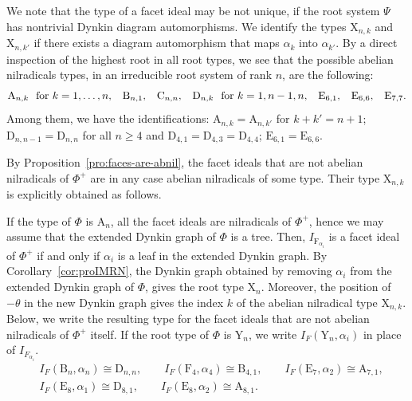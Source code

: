 \documentclass[ALCO,published]{cedram}
\theoremstyle{plain}
\newcommand\xuad{\hspace{2ex}}
\newcommand\al{\alpha}
\begin{document}
\par
We note that the type of a facet ideal may be not unique, if the root system $\Psi$ has nontrivial Dynkin diagram automorphisms. 
We identify the types $\mathrm X_{n,k}$ and $\mathrm X_{n,k'}$ if there exists a diagram automorphism that maps $\al_k$ into $\al_{k'}$.   
By a direct inspection of the highest root in all root types, we see that the possible abelian nilradicals types,  in an irreducible root system of rank $n$, are the following:  
$$
\mathrm A_{n, k}\ \text{ for } k=1,\dots, n, \xuad \mathrm B_{n,1},\xuad \mathrm C_{n, n},\xuad \mathrm D_{n,k}\ \text{ for } k=1, n-1, n,\xuad \mathrm E_{6,1},\xuad  \mathrm E_{6,6},\xuad \mathrm E_{7, 7}.
$$
Among them, we have  the identifications: $\mathrm A_{n, k}=\mathrm A_{n, k'}$
for $k+k'=n+1$; $\mathrm D_{n,n-1}=\mathrm D_{n,n}$ for all $n\geq 4$ and  $\mathrm D_{4,1}=\mathrm D_{4,3}=\mathrm D_{4,4}$; $\mathrm E_{6,1}=\mathrm E_{6,6}$.

\par
By  Proposition~\ref{pro:faces-are-abnil},  the facet ideals that are not abelian nilradicals of $\Phi^+$ are in any case abelian nilradicals of some type. 
Their type  $\mathrm X_{n,k}$ is explicitly obtained as follows.

\par
If the type of $\Phi$ is $\mathrm A_n$, all the facet ideals are nilradicals of $\Phi^+$, hence we may assume that the extended Dynkin graph of $\Phi$ is a tree.
Then, $I_{\mathrm F_{\al_i}}$ is a facet ideal of $\Phi^+$ if and only if  $\al_i$ is a leaf in the extended Dynkin graph.
By Corollary~\ref{cor:proIMRN}, the Dynkin graph obtained by removing $\al_i$ from the extended Dynkin graph of $\Phi$, gives the root type $\mathrm X_n$. 
Moreover, the position of $-\theta$ in the new Dynkin graph gives the index $k$ of the abelian nilradical type $\mathrm X_{n,k}$. 
Below, we write the resulting type for the facet ideals that are not abelian nilradicals of $\Phi^+$ itself. 
If the root type of $\Phi$ is  $\mathrm Y_n$, we write $I_F(\mathrm Y_n, \al_i)$ in place of $I_{F_{\al_i}}$.
\begin{align*}
&I_F(\mathrm B_n,\al_n)\cong \mathrm D_{n,n},\qquad 
I_F(\mathrm F_4,\al_4)\cong \mathrm B_{4,1},\qquad 
I_F(\mathrm E_7,\al_2) \cong \mathrm A_{7,1},
\\ 
&I_F({\mathrm E_8},\al_1)\cong \mathrm D_{8,1},\qquad I_F(\mathrm E_8,\al_2) \cong \mathrm A_{8,1}.
\end{align*}
\end{document}
